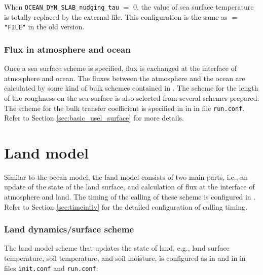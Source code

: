When \verb|OCEAN_DYN_SLAB_nudging_tau| $=$ 0, the value of sea surface temperature is totally replaced by the external file. This configuration is the same as  $=$ \verb|"FILE"| in the old version.

\subsubsection{Flux in atmosphere and ocean}
Once a sea surface scheme is specified, flux is exchanged at the interface of atmosphere and ocean. The fluxes between the atmosphere and the ocean are calculated by some kind of bulk schemes contained in \scalerm. The scheme for the length of the roughness on the sea surface is also selected from several schemes prepared. The scheme for the bulk transfer coefficient is specified in  in  in file \verb|run.conf|. Refer to Section \ref{sec:basic_usel_surface} for more details.


\section{Land model} \label{sec:basic_usel_land}
Similar to the ocean model, the land model consists of two main parts, i.e., an update of the state of the land surface, and calculation of flux at the interface of atmosphere and land. The timing of the calling of these scheme is configured in . Refer to Section \ref{sec:timeintiv} for the detailed configuration of calling timing.

\subsubsection{Land dynamics/surface scheme}
The land model scheme that updates the state of land, e.g., land surface temperature, soil temperature, and soil moisture, is configured as in  and  in  in files \verb|init.conf| and \verb|run.conf|:

